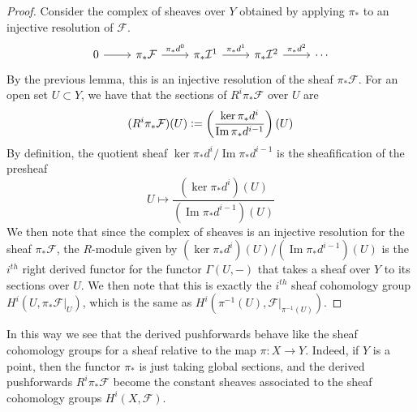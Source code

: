 \documentclass[psamsfonts, 12pt]{amsart}
\theoremstyle{definition}
\theoremstyle{remark}
\newcommand{\inv}{^{-1}}
\newcommand{\defeq}{\vcentcolon=}
\DeclareMathOperator{\im}{Im}
\begin{document}
\begin{proof}
Consider the complex of sheaves over $Y$ obtained by applying $\pi_*$ to an
injective resolution of $\mathcal{F}$.
\[\begin{tikzcd}
0 \ar[r] & \pi_*\mathcal{F} \ar[r, "\pi_*d^0"] &
\pi_*\mathcal{I}^1 \ar[r, "\pi_*d^1"] & \pi_*\mathcal{I}^2 \ar[r, "\pi_*d^2"] & \cdots
\end{tikzcd}\]
By the previous lemma, this is an injective resolution of the sheaf
$\pi_*\mathcal{F}$. For an open set $U \subset Y$, we have that the sections
of $R^i\pi_*\mathcal{F}$ over $U$ are
\[
(R^i\pi_*\mathcal{F})(U) \defeq \left(\frac{\ker \pi_*d^i}{\im\pi_*d^{i-1}}\right)(U)
\]
By definition, the quotient sheaf $\ker\pi_*d^i/\im\pi_*d^{i-1}$ is the sheafification
of the presheaf
\[
U \mapsto \frac{(\ker\pi_*d^i)(U)}{(\im\pi_*d^{i-1})(U)}
\]
We then note that since the complex of sheaves is an injective resolution for
the sheaf $\pi_*\mathcal{F}$, the $R$-module given by
$(\ker\pi_*d^i)(U)/(\im\pi_*d^{i-1})(U)$ is the $i^{th}$ right derived functor
for the functor $\Gamma(U,-)$ that takes a sheaf over $Y$ to its sections over $U$.
We then note that this is exactly the $i^{th}$ sheaf cohomology group
$H^i(U,\pi_*\mathcal{F}\vert_U)$,  which is the same as
$H^i(\pi\inv(U),\mathcal{F}\vert_{\pi\inv(U)})$.
\end{proof}
%
In this way we see that the derived pushforwards behave like the sheaf cohomology
groups for a sheaf relative to the map $\pi : X \to Y$. Indeed, if $Y$ is a point,
then the functor $\pi_*$ is just taking global sections, and the derived
pushforwards $R^i\pi_*\mathcal{F}$ become the constant sheaves associated
to the sheaf cohomology groups $H^i(X,\mathcal{F})$.
%
\end{document}
